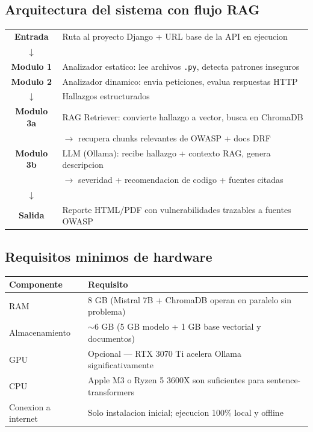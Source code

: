 \documentclass[12pt, a4paper]{article}
\begin{document}
\subsection{Arquitectura del sistema con flujo RAG}

\begin{graybox}
\begin{center}
\renewcommand{\arraystretch}{1.6}
\begin{tabular}{cl}
\textbf{Entrada}   & Ruta al proyecto Django + URL base de la API en ejecucion \\
$\downarrow$       & \\
\textbf{Modulo 1}  & Analizador estatico: lee archivos \texttt{.py}, detecta patrones inseguros \\
\textbf{Modulo 2}  & Analizador dinamico: envia peticiones, evalua respuestas HTTP \\
$\downarrow$       & Hallazgos estructurados \\
\textbf{Modulo 3a} & RAG Retriever: convierte hallazgo a vector, busca en ChromaDB \\
                   & $\rightarrow$ recupera chunks relevantes de OWASP + docs DRF \\
\textbf{Modulo 3b} & LLM (Ollama): recibe hallazgo + contexto RAG, genera descripcion \\
                   & $\rightarrow$ severidad + recomendacion de codigo + fuentes citadas \\
$\downarrow$       & \\
\textbf{Salida}    & Reporte HTML/PDF con vulnerabilidades trazables a fuentes OWASP \\
\end{tabular}
\end{center}
\end{graybox}

\subsection{Requisitos minimos de hardware}

\begin{center}
\begin{tabular}{ll}
\toprule
\textbf{Componente} & \textbf{Requisito} \\
\midrule
RAM & 8 GB (Mistral 7B + ChromaDB operan en paralelo sin problema) \\
Almacenamiento & $\sim$6 GB (5 GB modelo + 1 GB base vectorial y documentos) \\
GPU & Opcional --- RTX 3070 Ti acelera Ollama significativamente \\
CPU & Apple M3 o Ryzen 5 3600X son suficientes para sentence-transformers \\
Conexion a internet & Solo instalacion inicial; ejecucion 100\% local y offline \\
\bottomrule
\end{tabular}
\end{center}
\end{document}
